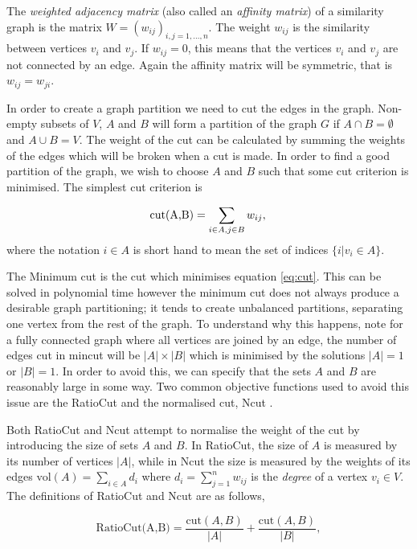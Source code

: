 The \textit{weighted adjacency matrix} (also called an \textit{affinity matrix}) of a similarity graph is the matrix $W = (w_{ij})_{i,j = 1,\ldots, n}$. The weight $w_{ij}$ is the similarity between vertices $v_i$ and $v_j$.  If $w_{ij}=0$, this means that the vertices $v_i$ and $v_j$ are not connected by an edge. Again the affinity matrix will be symmetric, that is $w_{ij} = w_{ji}$. 

In order to create a graph partition we need to cut the edges in the graph. Non-empty subsets of $V$, $A$ and $B$ will form a partition of the graph $G$ if $A \cap B = \emptyset  $ and $A \cup B = V$.  
The weight of the cut can be calculated by summing the weights of the edges which will be broken when a cut is made. In order to find a good partition of the graph, we wish to choose $A$ and $B$  such that some cut criterion is minimised.  The simplest cut criterion is

\begin{equation}
  \text{cut(A,B)} = \sum_{i \in A, j \in B} w_{ij},\\
  \label{eq:cut}
\end{equation}
where the notation $i \in A$ is short hand to mean the set of indices $\{ i | v_i \in A \}$.

The Minimum cut \citep{Wu1993} is the cut which minimises equation \eqref{eq:cut}. This can be solved in polynomial time \citep{Stoer1997} however the  minimum cut does not always produce a desirable graph partitioning; it tends to create unbalanced partitions, separating one vertex from the rest of the graph. To understand why this happens, note for a fully connected graph where all vertices are joined by an edge, the number of edges cut in mincut will be  $|A| \times |B|$ which is minimised by the solutions $|A| = 1$ or $|B| = 1$. In order to avoid this, we can specify that the sets $A$ and $B$ are reasonably large in some way. Two common objective functions used to avoid this issue are the RatioCut \citep{Hagen1992} and the normalised cut, Ncut \citep{Malik2000}. 

Both RatioCut and Ncut attempt to normalise the weight of the cut by introducing the size of sets $A$ and $B$. In RatioCut, the size of $A$ is measured by its number of vertices $|A|$, while in Ncut the size is measured by the weights of its edges $\text{vol}(A) = \sum_{i \in A}d_i$ where $d_i= \sum_{j = 1}^n w_{ij}$ is the \textit{degree} of a vertex $v_i \in V$. The definitions of RatioCut and Ncut are as follows, 

\begin{equation}
  \text{RatioCut(A,B)} = \frac{\text{cut} (A, B)}{|A|} + \frac{\text{cut}(A, B)}{|B|}, 
    \label{eq:ratiocut}
\end{equation}


